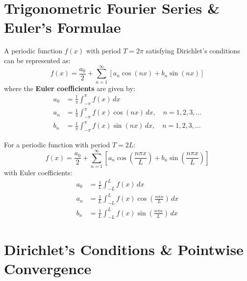 \section{Trigonometric Fourier Series \& Euler's Formulae}

\begin{definition}
A periodic function $f(x)$ with period $T = 2\pi$ satisfying Dirichlet's conditions can be represented as:
\begin{equation}
f(x) = \frac{a_0}{2} + \sum_{n=1}^\infty \left[ a_n \cos(nx) + b_n \sin(nx) \right]
\end{equation}
where the \textbf{Euler coefficients} are given by:
\begin{align}
a_0 &= \frac{1}{\pi} \int_{-\pi}^\pi f(x)\,dx \\
a_n &= \frac{1}{\pi} \int_{-\pi}^\pi f(x)\cos(nx)\,dx, \quad n = 1, 2, 3, \dots \\
b_n &= \frac{1}{\pi} \int_{-\pi}^\pi f(x)\sin(nx)\,dx, \quad n = 1, 2, 3, \dots
\end{align}
\end{definition}

\begin{definition}
For a periodic function with period $T = 2L$:
\begin{equation}
f(x) = \frac{a_0}{2} + \sum_{n=1}^\infty \left[ a_n \cos\left(\frac{n\pi x}{L}\right) + b_n \sin\left(\frac{n\pi x}{L}\right) \right]
\end{equation}
with Euler coefficients:
\begin{align}
a_0 &= \frac{1}{L} \int_{-L}^L f(x)\,dx \\
a_n &= \frac{1}{L} \int_{-L}^L f(x)\cos\left(\frac{n\pi x}{L}\right)\,dx \\
b_n &= \frac{1}{L} \int_{-L}^L f(x)\sin\left(\frac{n\pi x}{L}\right)\,dx
\end{align}
\end{definition}

\section{Dirichlet's Conditions \& Pointwise Convergence}

